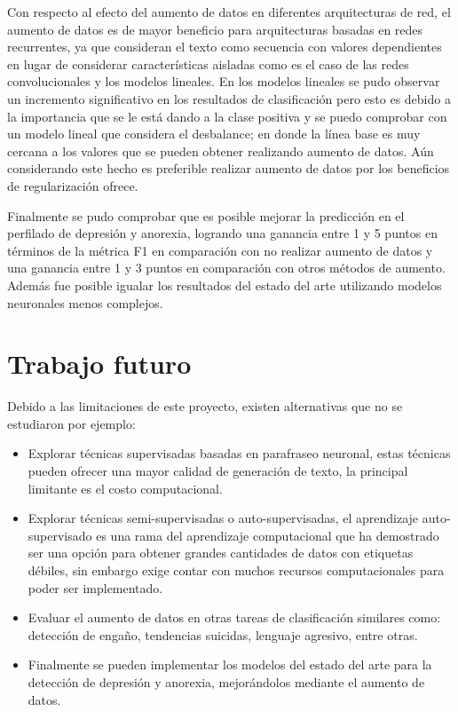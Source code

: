 Con respecto al efecto del aumento de datos en diferentes arquitecturas de red, el aumento de datos es de mayor beneficio para arquitecturas basadas en redes recurrentes, ya que consideran el texto como secuencia con valores dependientes en lugar de considerar características aisladas como es el caso de las redes convolucionales y los modelos lineales. En los modelos lineales se pudo observar un incremento significativo en los resultados de clasificación pero esto es debido a la importancia que se le está dando a la clase positiva y se puedo comprobar con un modelo lineal que considera el desbalance; en donde la línea base es muy cercana a los valores que se pueden obtener realizando aumento de datos. Aún considerando este hecho es preferible realizar aumento de datos por los beneficios de regularización ofrece.

Finalmente se pudo comprobar que es posible mejorar la predicción en el perfilado de depresión y anorexia, logrando una ganancia entre 1 y 5 puntos en términos de la métrica F1 en comparación con no realizar aumento de datos y una ganancia entre 1 y 3 puntos en comparación con otros métodos de aumento. Además fue posible igualar los resultados del estado del arte utilizando modelos neuronales menos complejos.


\section{Trabajo futuro}

Debido a las limitaciones de este proyecto, existen alternativas que no se estudiaron por ejemplo:

\begin{itemize}
    \item Explorar técnicas supervisadas basadas en parafraseo neuronal, estas técnicas pueden ofrecer una mayor calidad de generación de texto, la principal limitante es el costo computacional.
    
    \item Explorar técnicas semi-supervisadas o auto-supervisadas, el aprendizaje auto-supervisado es una rama del aprendizaje computacional que ha demostrado ser una opción para obtener grandes cantidades de datos con etiquetas débiles, sin embargo exige contar con muchos recursos computacionales para poder ser implementado.
    
    \item Evaluar el aumento de datos en otras tareas de clasificación similares como: detección de engaño, tendencias suicidas, lenguaje agresivo, entre otras.
    
    \item Finalmente se pueden implementar los modelos del estado del arte para la detección de depresión y anorexia, mejorándolos mediante el aumento de datos.
    
\end{itemize}
